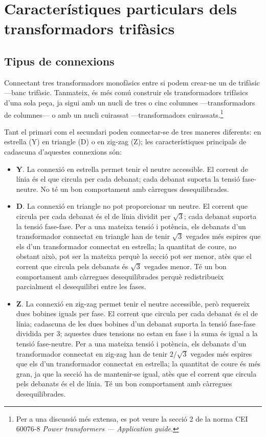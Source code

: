 \section{Característiques particulars  dels transformadors trifàsics}\label{sec:caract-trans-trif}

\subsection{Tipus de connexions}


Connectant tres transformadors monofàsics entre si podem crear-ne un de trifàsic ---banc trifàsic. Tanmateix, és més comú construir els transformadors trifàsics d'una sola peça, ja sigui amb un nucli de tres o cinc columnes ---transformadors de columnes--- o amb un nucli  cuirassat ---transformadors cuirassats.\footnote{Per a una discussió més extensa, es pot veure la secció 2 de la norma CEI 60076-8 \emph{Power transformers --- Application guide}.}

Tant el primari com el secundari poden connectar-se de tres maneres diferents: en estrella (Y) en triangle (D) o en zig-zag (Z); les característiques principals de cadascuna d'aquestes connexions són:

\begin{itemize}
   \item \textbf{Y}. La connexió en estrella permet tenir el neutre accessible. El corrent de línia és el que circula per cada debanat; cada debanat suporta la tensió fase-neutre. No té un bon comportament amb càrregues desequilibrades.
   \item \textbf{D}. La connexió en triangle no pot proporcionar un neutre. El corrent que circula per cada debanat és el de línia dividit per $\sqrt{3}$; cada debanat suporta la tensió fase-fase. Per a una mateixa tensió i potència, els debanats d'un transformador connectat en triangle han de tenir $\sqrt{3}$ vegades més espires que els d'un transformador connectat en estrella; la quantitat de coure, no obstant això, pot ser la mateixa perquè la secció pot ser menor, atès que el corrent que circula pels debanats és $\sqrt{3}$ vegades menor. Té un bon comportament amb càrregues desequilibrades perquè redistribueix parcialment el desequilibri entre les fases.
   \item \textbf{Z}. La connexió en zig-zag permet tenir el neutre accessible, però requereix dues bobines iguals per fase. El corrent que circula per cada debanat és el de línia; cadascuna de les dues bobines d'un debanat suporta la tensió fase-fase dividida per 3; aquestes dues tensions no estan en fase i la  suma és igual a la tensió fase-neutre. Per a una mateixa tensió i potència, els debanats d'un transformador connectat en zig-zag han de tenir $2/\sqrt{3}$ vegades més espires que els d'un transformador connectat en estrella; la quantitat de coure és més gran, ja que la secció ha de mantenir-se igual, atès que el corrent que circula pels debanats és el de línia. Té un bon comportament amb càrregues desequilibrades.
\end{itemize}

